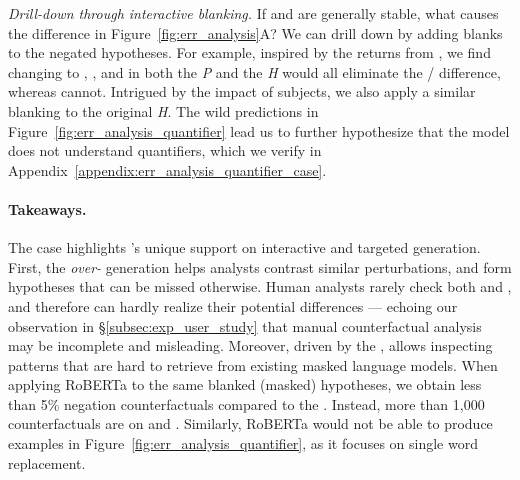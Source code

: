 \emph{Drill-down through interactive blanking.}
If  and  are generally stable, what causes the difference in Figure~\ref{fig:err_analysis}A?
We can drill down by adding blanks to the negated hypotheses.
For example, inspired by the returns from , we find changing  to , , and  in both the \emph{P} and the \emph{H} would all eliminate the / difference, whereas  cannot.
Intrigued by the impact of subjects, we also apply a similar blanking to the original \emph{H}.
The wild predictions in Figure~\ref{fig:err_analysis_quantifier} lead us to further hypothesize that the model does not understand quantifiers, which we verify in Appendix~\ref{appendix:err_analysis_quantifier_case}.


\paragraph{Takeaways.}
The case highlights \sysname's unique support on interactive and targeted generation.
First, the \emph{over-} generation helps analysts contrast similar perturbations, and form hypotheses that can be missed otherwise.
Human analysts rarely check both  and , and therefore can hardly realize their potential differences --- echoing our observation in \S\ref{subsec:exp_user_study} that manual counterfactual analysis may be incomplete and misleading.
Moreover, driven by the \tagstrs, \sysname allows inspecting patterns that are hard to retrieve from existing masked language models.
When applying RoBERTa to the same blanked (masked) hypotheses, we obtain less than 5\% negation counterfactuals compared to the \sysname.
Instead, more than 1,000 counterfactuals are on  and .
Similarly, RoBERTa would not be able to produce examples in Figure~\ref{fig:err_analysis_quantifier}, as it focuses on single word replacement.

